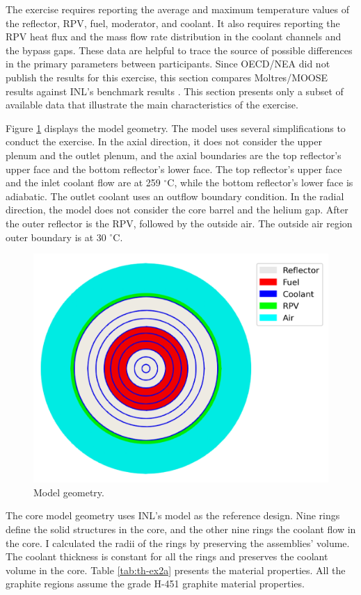 The exercise requires reporting the average and maximum temperature values of the reflector, \gls{RPV}, fuel, moderator, and coolant.
It also requires reporting the RPV heat flux and the mass flow rate distribution in the coolant channels and the bypass gaps.
These data are helpful to trace the source of possible differences in the primary parameters between participants.
Since OECD/NEA did not publish the results for this exercise, this section compares Moltres/MOOSE results against INL's benchmark results \cite{strydom_inl_2013}.
This section presents only a subset of available data that illustrate the main characteristics of the exercise.

Figure \ref{fig:ex2a-1st-model} displays the model geometry.
The model uses several simplifications to conduct the exercise.
In the axial direction, it does not consider the upper plenum and the outlet plenum, and the axial boundaries are the top reflector's upper face and the bottom reflector's lower face.
The top reflector's upper face and the inlet coolant flow are at 259 $^{\circ}$C, while the bottom reflector's lower face is adiabatic.
The outlet coolant uses an outflow boundary condition.
In the radial direction, the model does not consider the core barrel and the helium gap.
After the outer reflector is the RPV, followed by the outside air.
The outside air region outer boundary is at 30 $^{\circ}$C.

\begin{figure}[htbp!]
  \centering
  \includegraphics[width=0.45\linewidth]{figures-thermal/ex2a-meshD2}
  \hfill
  \caption{Model geometry.}
  \label{fig:ex2a-1st-model}
\end{figure}

The core model geometry uses INL's model as the reference design.
Nine rings define the solid structures in the core, and the other nine rings the coolant flow in the core.
I calculated the radii of the rings by preserving the assemblies' volume.
The coolant thickness is constant for all the rings and preserves the coolant volume in the core.
Table \ref{tab:th-ex2a} presents the material properties.
All the graphite regions assume the grade H-451 graphite material properties.

